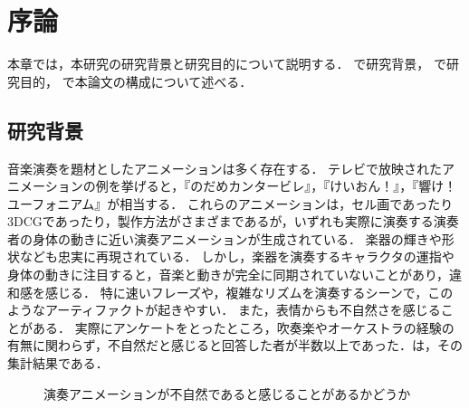 \chapter{序論}
\label{chap:intro}

本章では，本研究の研究背景と研究目的について説明する．
で研究背景，
で研究目的，
で本論文の構成について述べる．

\section{研究背景}\label{sec:background}
\indent
音楽演奏を題材としたアニメーションは多く存在する．
テレビで放映されたアニメーションの例を挙げると，『のだめカンタービレ』，『けいおん！』，『響け！ユーフォニアム』が相当する．
これらのアニメーションは，セル画であったり3DCGであったり，製作方法がさまざまであるが，いずれも実際に演奏する演奏者の身体の動きに近い演奏アニメーションが生成されている．
楽器の輝きや形状なども忠実に再現されている．
しかし，楽器を演奏するキャラクタの運指や身体の動きに注目すると，音楽と動きが完全に同期されていないことがあり，違和感を感じる．
特に速いフレーズや，複雑なリズムを演奏するシーンで，このようなアーティファクトが起きやすい．
また，表情からも不自然さを感じることがある．
実際にアンケートをとったところ，吹奏楽やオーケストラの経験の有無に関わらず，不自然だと感じると回答した者が半数以上であった．は，その集計結果である．
\begin{figure}[h]
	\centering
	\caption{演奏アニメーションが不自然であると感じることがあるかどうか}
	\label{fig:q1}
\end{figure}

